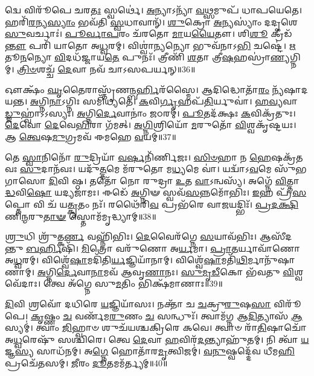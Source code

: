 𑌦𑍍𑌵𑍇 𑌵𑌿𑌰𑍂᳴𑌪𑍇 𑌚𑌰\-\ul{𑌤𑌃} 𑌸𑍍𑌵𑌰𑍍𑌥𑍇॑।
\-\ul{𑌅}\-𑌨𑍍𑌯𑌾\-𑌽𑌨𑍍𑌯𑌾᳴ \ul{𑌵}\-𑌥𑍍𑌸𑌮𑍁𑌪᳴ 𑌧𑌾𑌪𑌯𑍇𑌤𑍇।
𑌹𑌰𑌿᳴\-\ul{𑌰}\-𑌨𑍍𑌯\-\ul{𑌸𑍍𑌯𑌾𑌂} 𑌭𑌵᳴𑌤𑌿 \ul{𑌸𑍍𑌵}\-𑌧𑌾𑌵𑌾𑌨𑍍᳴।
\-\ul{𑌶𑍁}\-𑌕𑍍𑌰𑍋 \ul{𑌅}\-𑌨𑍍𑌯𑌸𑍍𑌯𑌾𑌂॑ 𑌦𑌦𑍃𑌶𑍇 \ul{𑌸𑍁}\-𑌵𑌰𑍍𑌚𑌾𑌃॑।
\-\ul{𑌪𑍂}\-\-\ul{𑌰𑍍𑌵𑌾}\-\-\ul{𑌪}\-𑌰𑌂 𑌚᳴𑌰𑌤𑍋 \ul{𑌮𑌾}\-𑌯\-\ul{𑌯𑍈}\-𑌤𑍗।
𑌶𑌿\-\ul{𑌶𑍂} 𑌕𑍍𑌰𑍀𑌡᳴\-\ul{𑌨𑍍𑌤𑍗} 𑌪𑌰𑌿᳴ 𑌯𑌾𑌤𑍋 𑌅\-\ul{𑌧𑍍𑌵}\-𑌰𑌮𑍍।
𑌵𑌿𑌶𑍍𑌵𑌾॑\-\ul{𑌨𑍍𑌯}\-𑌨𑍍𑌯𑍋 𑌭𑍁𑌵᳴𑌨𑌾𑌽\-\ul{𑌭𑌿} 𑌚𑌷𑍍𑌟𑍇॑।
\-\ul{𑌋}\-𑌤𑍂\-\ul{𑌨}\-𑌨𑍍𑌯𑍋 \ul{𑌵𑌿}\-𑌦𑌧᳴𑌜𑍍𑌜𑌾𑌯\-\ul{𑌤𑍇} 𑌪𑍁𑌨𑌃᳴।
𑌤𑍍𑌰𑍀𑌣𑌿᳴ \ul{𑌶}\-𑌤𑌾 𑌤𑍍𑌰𑍀\-\ul{𑌷}\-𑌹𑌸𑍍𑌰𑌾॑\-\ul{𑌣𑍍𑌯}\-𑌗𑍍𑌨𑌿𑌮𑍍।
\-\ul{𑌤𑍍𑌰𑌿}\-\-\ul{𑍞}\-𑌶𑌚𑍍𑌚᳴ \ul{𑌦𑍇}\-𑌵𑌾 𑌨𑌵᳴ 𑌚𑌾𑌽𑌸𑌪𑌰𑍍𑌯𑌨𑍍॥36॥

𑌔𑌕𑍍𑌷𑌂᳴ \ul{𑌘𑍃}\-𑌤𑍈𑌰𑌾𑌸𑍍𑌤𑍃᳴𑌣\-\ul{𑌨𑍍𑌬}\-\-\ul{𑌰𑍍}\-𑌹𑌿𑌰᳴𑌸𑍍𑌮𑍈।
𑌆𑌦𑌿𑌦𑍍𑌧𑍋𑌤𑌾᳴\-\ul{𑌰𑌂} 𑌨𑍍𑌯᳴𑌷𑌾𑌦𑌯𑌨𑍍𑌤।
\-\ul{𑌅}\-𑌗𑍍𑌨𑌿\-\ul{𑌨𑌾}\-\-𑌽𑌗𑍍𑌨𑌿𑌃 𑌸𑌮𑌿᳴𑌧𑍍𑌯𑌤𑍇।
\-\ul{𑌕}\-𑌵𑌿\-\ul{𑌰𑍍𑌗𑍃}\-𑌹𑌪᳴\-\ul{𑌤𑌿}\-𑌰𑍍𑌯𑍁𑌵𑌾॑।
\-\ul{𑌹}\-\-\ul{𑌵𑍍𑌯}\-𑌵𑌾\-\ul{𑌡𑍍𑌜𑍁}\-𑌹𑍍𑌵𑌾॑𑌽𑌽𑌸𑍍𑌯𑌃।
\-\ul{𑌅}\-𑌗𑍍𑌨𑌿\-\ul{𑌰𑍍𑌦𑍇}\-𑌵𑌾𑌨𑌾𑌂॑ \ul{𑌜}\-𑌠𑌰𑌮𑍍॑।
\-\ul{𑌪𑍂}\-𑌤𑌦᳴𑌕𑍍𑌷𑌃 \ul{𑌕}\-𑌵𑌿𑌕𑍍𑌰᳴𑌤𑍁𑌃।
\-\ul{𑌦𑍇}\-𑌵𑍋 \ul{𑌦𑍇}\-𑌵𑍇\-\ul{𑌭𑌿}\-𑌰𑌾 𑌗᳴𑌮𑌤𑍍।
\-\ul{𑌅}\-\-\ul{𑌗𑍍𑌨𑌿}\-𑌶𑍍𑌰𑌿𑌯𑍋᳴ \ul{𑌮}\-𑌰𑍁𑌤𑍋᳴ \ul{𑌵𑌿}\-𑌶𑍍𑌵𑌕𑍃᳴𑌷𑍍𑌟𑌯𑌃।
𑌆 \ul{𑌤𑍍𑌵𑍇}\-𑌷\-\ul{𑌮𑍁}\-𑌗𑍍𑌰𑌮𑌵᳴ 𑌈𑌮𑌹𑍇 \ul{𑌵}\-𑌯𑌮𑍍॥37॥

𑌤𑍇 \ul{𑌸𑍍𑌵𑌾}\-𑌨𑌿𑌨𑍋᳴ \ul{𑌰𑍁}\-𑌦𑍍𑌰𑌿𑌯𑌾᳴ \ul{𑌵}\-\-\ul{𑌰𑍍}\-𑌷𑌨𑌿᳴𑌰𑍍𑌣𑌿𑌜𑌃।
\-\ul{𑌸𑌿}\-\-\ul{𑍞}\-𑌹𑌾 𑌨 \ul{𑌹𑍇}\-𑌷𑌕𑍍𑌰᳴𑌤𑌵𑌃 \ul{𑌸𑍁}\-𑌦𑌾𑌨᳴𑌵𑌃।
𑌯𑌦𑍁᳴\-\ul{𑌤𑍍𑌤}\-𑌮𑍇 𑌮᳴𑌰𑍁𑌤𑍋 𑌮\-\ul{𑌧𑍍𑌯}\-𑌮𑍇 𑌵𑌾॑।
𑌯𑌦𑍍𑌵𑌾᳴\-𑌽\-\ul{𑌵}\-𑌮𑍇 𑌸𑍁᳴𑌭𑌗𑌾𑌸𑍋 \ul{𑌦𑌿}\-𑌵𑌿 𑌷𑍍𑌠।
𑌤𑌤𑍋᳴ 𑌨𑍋 𑌰𑍁𑌦𑍍𑌰𑌾 \ul{𑌉}\-𑌤 \ul{𑌵𑌾}\-\-𑌽𑌨𑍍𑌵𑌸𑍍𑌯᳴।
𑌅𑌗𑍍𑌨𑍇᳴ \ul{𑌵𑌿}\-𑌤𑍍𑌤𑌾\-\ul{𑌦𑍍𑌧}\-𑌵𑌿\-\ul{𑌷𑍋} 𑌯𑌦𑍍𑌯𑌜𑌾᳴𑌮𑌃।
𑌈𑌡𑍇᳴ \ul{𑌅}\-𑌗𑍍𑌨𑌿𑍟 𑌸𑍍𑌵𑌵᳴\-\ul{𑌸}\-𑌨𑍍𑌨𑌮𑍋᳴𑌭𑌿𑌃।
\-\ul{𑌇}\-𑌹 𑌪𑍍𑌰᳴\-\ul{𑌸}\-𑌪𑍍𑌤𑍋 𑌵𑌿 𑌚᳴ 𑌯\-\ul{𑌤𑍍𑌕𑍃}\-𑌤𑌂 𑌨𑌃᳴।
𑌰𑌥𑍈᳴𑌰𑌿\-\ul{𑌵} 𑌪𑍍𑌰𑌭᳴𑌰𑍇 𑌵𑌾\-\ul{𑌜}\-𑌯𑌦𑍍𑌭𑌿𑌃᳴।
\-\ul{𑌪𑍍𑌰}\-\-\ul{𑌦}\-\-\ul{𑌕𑍍𑌷𑌿}\-𑌣𑌿\-\ul{𑌨𑍍𑌮}\-𑌰𑍁\-\ul{𑌤𑌾}\-\-\ul{𑍟} 𑌸𑍍𑌤𑍋𑌮᳴𑌮𑍃𑌦𑍍𑌧𑍍𑌯𑌾𑌮𑍍॥38॥

\-\ul{𑌶𑍍𑌰𑍁}\-𑌧𑌿 𑌶𑍍𑌰𑍁᳴𑌤𑍍𑌕\-\ul{𑌰𑍍𑌣} 𑌵𑌹𑍍𑌨𑌿᳴𑌭𑌿𑌃।
\-\ul{𑌦𑍇}\-𑌵𑍈𑌰᳴𑌗𑍍𑌨𑍇 \ul{𑌸}\-𑌯𑌾𑌵᳴𑌭𑌿𑌃।
𑌆𑌸𑍀᳴𑌦𑌨𑍍𑌤𑍁 \ul{𑌬}\-\-\ul{𑌰𑍍}\-𑌹𑌿𑌷𑌿᳴।
\-\ul{𑌮𑌿}\-𑌤𑍍𑌰𑍋 𑌵𑌰𑍁᳴𑌣𑍋 𑌅\-\ul{𑌰𑍍𑌯}\-𑌮𑌾।
\-\ul{𑌪𑍍𑌰𑌾}\-\-\ul{𑌤}\-𑌰𑍍𑌯𑌾𑌵𑌾᳴𑌣𑍋 𑌅\-\ul{𑌧𑍍𑌵}\-𑌰𑌮𑍍।
𑌵𑌿𑌶𑍍𑌵𑍇᳴\-\ul{𑌷𑌾}\-𑌮𑌦𑌿᳴𑌤𑌿\-\ul{𑌰𑍍𑌯}\-𑌜𑍍𑌞𑌿𑌯𑌾᳴𑌨𑌾𑌮𑍍।
𑌵𑌿𑌶𑍍𑌵𑍇᳴\-\ul{𑌷𑌾}\-𑌮𑌤𑌿᳴\-\ul{𑌥𑌿}\-𑌰𑍍𑌮𑌾𑌨𑍁᳴𑌷𑌾𑌣𑌾𑌮𑍍।
\-\ul{𑌅}\-𑌗𑍍𑌨𑌿\-\ul{𑌰𑍍𑌦𑍇}\-𑌵𑌾\-\ul{𑌨𑌾}\-\-𑌮𑌵᳴ 𑌆𑌵𑍃\-\ul{𑌣𑌾}\-𑌨𑌃।
\-\ul{𑌸𑍁}\-\-\ul{𑌮𑍃}\-\-\ul{𑌡𑍀}\-𑌕𑍋 𑌭᳴𑌵𑌤𑍁 \ul{𑌵𑌿}\-𑌶𑍍𑌵𑌵𑍇᳴𑌦𑌾𑌃।
𑌤𑍍𑌵𑍇 𑌅᳴𑌗𑍍𑌨𑍇 𑌸𑍁\-\ul{𑌮}\-𑌤𑌿𑌂 𑌭𑌿𑌕𑍍𑌷᳴𑌮𑌾𑌣𑌾𑌃॥39॥

\-\ul{𑌦𑌿}\-𑌵𑌿 𑌶𑍍𑌰𑌵𑍋᳴ 𑌦𑌧𑌿𑌰𑍇 \ul{𑌯}\-𑌜𑍍𑌞𑌿𑌯𑌾᳴𑌸𑌃।
𑌨𑌕𑍍𑌤𑌾᳴ 𑌚 \ul{𑌚}\-𑌕𑍍𑌰𑍁\-\ul{𑌰𑍁}\-𑌷\-\ul{𑌸𑌾} 𑌵𑌿𑌰𑍂᳴𑌪𑍇।
\-\ul{𑌕𑍃}\-𑌷𑍍𑌣𑌂 \ul{𑌚} 𑌵𑌰𑍍𑌣᳴𑌮\-\ul{𑌰𑍁}\-𑌣𑌂 \ul{𑌚} 𑌸𑌨𑍍𑌧𑍁𑌃᳴।
𑌤𑍍𑌵𑌾𑌮᳴𑌗𑍍𑌨 𑌆\-\ul{𑌦𑌿}\-𑌤𑍍𑌯𑌾𑌸᳴ \ul{𑌆}\-𑌸𑍍𑌯𑌮𑍍॑।
𑌤𑍍𑌵𑌾𑌂 \ul{𑌜𑌿}\-𑌹𑍍𑌵𑌾𑍞 𑌶𑍁𑌚᳴𑌯𑌶𑍍𑌚𑌕𑍍𑌰𑌿𑌰𑍇 𑌕𑌵𑍇।
𑌤𑍍𑌵𑌾𑍞 𑌰𑌾᳴\-\ul{𑌤𑌿}\-𑌷𑌾𑌚𑍋᳴ 𑌅\-\ul{𑌧𑍍𑌵}\-𑌰𑍇𑌷𑍁᳴ 𑌸𑌶𑍍𑌚𑌿𑌰𑍇।
𑌤𑍍𑌵𑍇 \ul{𑌦𑍇}\-𑌵𑌾 \ul{𑌹}\-𑌵𑌿𑌰᳴\-\ul{𑌦}\-𑌨𑍍𑌤𑍍𑌯𑌾𑌹𑍁᳴𑌤𑌮𑍍।
𑌨𑌿 𑌤𑍍𑌵𑌾᳴ \ul{𑌯}\-𑌜𑍍𑌞\-\ul{𑌸𑍍𑌯} 𑌸𑌾𑌧᳴𑌨𑌮𑍍।
𑌅\-\ul{𑌗𑍍𑌨𑍇} 𑌹𑍋𑌤𑌾᳴𑌰\-\ul{𑌮𑍃}\-𑌤𑍍𑌵𑌿𑌜𑌮𑍍॑।
\-\ul{𑌵}\-\-\ul{𑌨𑍁}\-𑌷𑍍𑌵𑌦𑍍𑌦𑍇᳴𑌵 𑌧𑍀𑌮\-\ul{𑌹𑌿} 𑌪𑍍𑌰𑌚𑍇᳴𑌤𑌸𑌮𑍍।
\-\ul{𑌜𑍀}\-𑌰𑌂 \ul{𑌦𑍂}\-𑌤𑌮𑌮᳴𑌰𑍍𑌤𑍍𑌯𑌮𑍍॥40॥\anuvakamend[\-\ul{𑌯}\-\-\ul{𑌜𑍍𑌞}\-\-\ul{𑌵𑌾}\-\-\ul{𑌹}\-\-\ul{𑌸𑌾}\-\-\ul{𑌸}\-\-\ul{𑌪}\-\-\ul{𑌰𑍍𑌯}\-\-\ul{𑌨𑍍𑌵}\-𑌯𑌮𑍃᳴\-\ul{𑌦𑍍𑌧𑍍𑌯𑌾𑌂} 𑌭𑌿𑌕𑍍𑌷᳴𑌮𑌾\-\ul{𑌣𑌾𑌃} 𑌪𑍍𑌰𑌚𑍇᳴𑌤\-\ul{𑌸}\-𑌮𑍇𑌕𑌂᳴ 𑌚]

